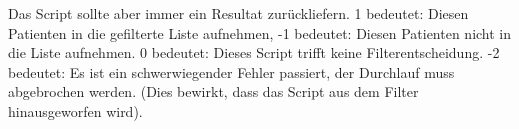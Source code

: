 \documentclass[a4paper]{scrartcl}
\begin{document}
\vspace{3mm}

Das Script sollte aber immer ein Resultat zurückliefern. 1 bedeutet: Diesen Patienten in die gefilterte Liste aufnehmen, -1 bedeutet: Diesen Patienten nicht in die Liste aufnehmen. 0 bedeutet: Dieses Script trifft keine Filterentscheidung. -2 bedeutet: Es ist ein schwerwiegender Fehler passiert, der Durchlauf muss abgebrochen werden. (Dies bewirkt, dass das Script aus dem Filter hinausgeworfen wird).
\end{document}
